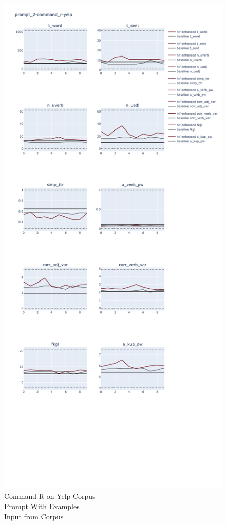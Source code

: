 \documentclass[11pt]{article}
\begin{document}
\begin{figure}[ht]
    \includegraphics[width=\textwidth,height=0.9\textheight,scale=1]{plots/prompt_2_ifd/prompt_2-command_r-yelp/prompt_2-command_r-yelp.png}
    \caption{Command R on Yelp Corpus\\Prompt With Examples\\Input from Corpus}
    \label{fig:command_r-prompt2-yelp-ifd}
\end{figure}
\end{document}

